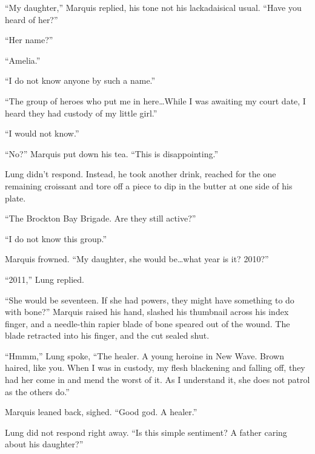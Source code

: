 ``My daughter,'' Marquis replied, his tone not his lackadaisical usual.  ``Have you heard of her?''



``Her name?''



``Amelia.''



``I do not know anyone by such a name.''



``The group of heroes who put me in here\ldots While I was awaiting my court date, I heard they had custody of my little girl.''



``I would not know.''



``No?'' Marquis put down his tea.  ``This is disappointing.''



Lung didn't respond.  Instead, he took another drink, reached for the one remaining croissant and tore off a piece to dip in the butter at one side of his plate.



``The Brockton Bay Brigade.  Are they still active?''



``I do not know this group.''



Marquis frowned.  ``My daughter, she would be\ldots what year is it?  2010?''



``2011,'' Lung replied.



``She would be seventeen.  If she had powers, they might have something to do with bone?''  Marquis raised his hand, slashed his thumbnail across his index finger, and a needle-thin rapier blade of bone speared out of the wound.  The blade retracted into his finger, and the cut sealed shut.



``Hmmm,'' Lung spoke, ``The healer.  A young heroine in New Wave.  Brown haired, like you.  When I was in custody, my flesh blackening and falling off, they had her come in and mend the worst of it.  As I understand it, she does not patrol as the others do.''



Marquis leaned back, sighed.  ``Good god.  A healer.''



Lung did not respond right away.  ``Is this simple sentiment?  A father caring about his daughter?''



